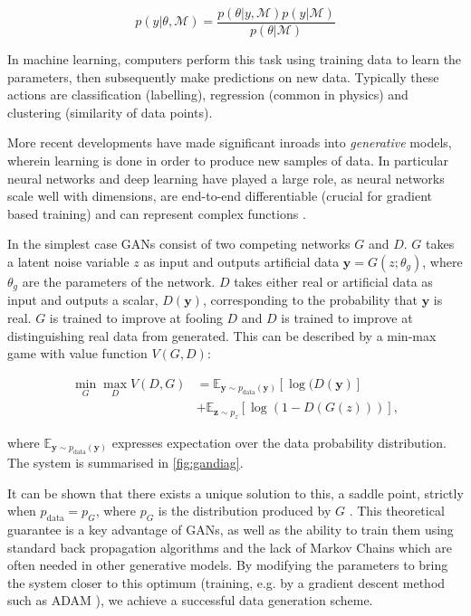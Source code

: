 \documentclass[twocolumn]{article}
\begin{document}
\[
p(y|\theta, \mathcal{M}) = \frac{p(\theta|y, \mathcal{M})p(y|\mathcal{M})}{p(\theta|\mathcal{M})}
\]

In machine learning, computers perform this task using training data to learn the parameters, then subsequently make predictions on new data. Typically these actions are classification (labelling), regression (common in physics) and clustering (similarity of data points). 

More recent developments have made significant inroads into \textit{generative} models, wherein learning is done in order to produce new samples of data. In particular neural networks and deep learning have played a large role, as neural networks scale well with dimensions, are end-to-end differentiable (crucial for gradient based training) and can represent complex functions \cite{deepgen}.


In the simplest case GANs consist of two competing networks $G$ and $D$. $G$ takes a latent noise variable $z$ as input and outputs artificial data $\mathbf{y} = G(z;\theta_g)$, where $\theta_g$ are the parameters of the network. $D$ takes either real or artificial data as input and outputs a scalar, $D(\mathbf{y})$, corresponding to the probability that $\mathbf{y}$ is real. $G$ is trained to improve at fooling $D$ and $D$ is trained to improve at distinguishing real data from generated. This can be described by a min-max game with value function $V(G,D)$:

\begin{equation}
	\label{eq:minmax}
	\begin{split}
	\min_{G}\max_{D}V(D,G) &= \mathbb{E}_{\mathbf{y}\sim p_{\text{data}}(\mathbf{y})} [\log(D(\mathbf{y})]\\
	&  +\mathbb{E}_{\mathbf{z}\sim p_{z}} [\log(1-D(G(z)))],
	\end{split}
\end{equation} 

where  $\mathbb{E}_{\mathbf{y}\sim p_{\text{data}}(\mathbf{y})}$ expresses expectation over the data probability distribution. The system is summarised in \cref{fig:gandiag}.

It can be shown that there exists a unique solution to this, a saddle point, strictly when $p_{\text{data}} = p_G$, where $p_G$ is the distribution produced by $G$ \cite{gan1}. This theoretical guarantee is a key advantage of GANs, as well as the ability to train them using standard back propagation algorithms and the lack of Markov Chains which are often needed in other generative models. By modifying the parameters to bring the system closer to this optimum (training, e.g. by a gradient descent method such as ADAM \cite{adam}), we achieve a successful data generation scheme.   
\end{document}
